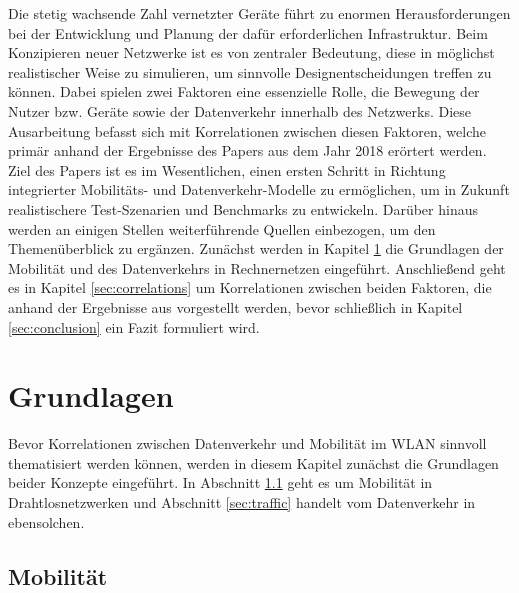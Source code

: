 \documentclass[12pt, a4paper]{article}
\begin{document}
Die stetig wachsende Zahl vernetzter Geräte führt zu enormen Herausforderungen bei der Entwicklung
und Planung der dafür erforderlichen Infrastruktur. Beim Konzipieren neuer Netzwerke ist es von zentraler
Bedeutung, diese in möglichst realistischer Weise zu simulieren, um sinnvolle Designentscheidungen
treffen zu können. Dabei spielen zwei Faktoren eine essenzielle Rolle, die Bewegung der Nutzer bzw. Geräte
sowie der Datenverkehr innerhalb des Netzwerks.
Diese Ausarbeitung befasst sich mit Korrelationen zwischen diesen Faktoren,
welche primär anhand der Ergebnisse des Papers  \cite{Alipour2018} aus dem Jahr 2018 erörtert werden.
Ziel des Papers ist es im Wesentlichen, einen ersten Schritt in Richtung integrierter Mobilitäts- und Datenverkehr-Modelle 
zu ermöglichen, um in Zukunft realistischere Test-Szenarien und Benchmarks zu entwickeln.
Darüber hinaus werden an einigen Stellen weiterführende Quellen einbezogen, um den Themenüberblick zu ergänzen.\newline
Zunächst werden in Kapitel \ref{sec:basics} die Grundlagen der Mobilität und des Datenverkehrs in Rechnernetzen
eingeführt. Anschließend geht es in Kapitel \ref{sec:correlations} um Korrelationen zwischen beiden
Faktoren, die anhand der Ergebnisse aus \cite{Alipour2018} vorgestellt werden,
bevor schließlich in Kapitel \ref{sec:conclusion} ein Fazit formuliert wird.

\section{Grundlagen}
\label{sec:basics}

Bevor Korrelationen zwischen Datenverkehr und Mobilität im WLAN sinnvoll thematisiert werden können, 
werden in diesem Kapitel zunächst die Grundlagen beider Konzepte eingeführt.
In Abschnitt \ref{sec:mobility} geht es um Mobilität in Drahtlosnetzwerken und Abschnitt \ref{sec:traffic} handelt
vom Datenverkehr in ebensolchen.

\subsection{Mobilität}
\label{sec:mobility}
\end{document}
